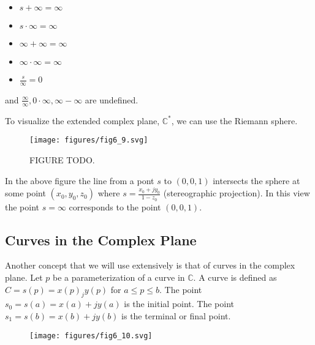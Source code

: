 \documentclass{article}
\begin{document}
\begin{itemize}
\item $s + \infty = \infty$
\item $s \cdot \infty = \infty$
\item $\infty + \infty = \infty$
\item $\infty \cdot \infty = \infty$
\item $\frac{s}{\infty} = 0$
\end{itemize}

and $\frac{\infty}{\infty}, 0\cdot\infty, \infty-\infty$ are undefined.

To visualize the extended complex plane, $\mathbb{C}^*$, we can use the Riemann sphere.

\begin{figure}
  \centering
  \texttt{[image: figures/fig6\_9.svg]}
  \caption{FIGURE TODO.}
\end{figure}

In the above figure the line from a pont $s$ to $(0,0,1)$ intersects the sphere at some point $(x_0,y_0,z_0)$ where $s = \frac{x_0 + jy_0}{1-z_0}$ (stereographic projection). In this view the point $s = \infty$ corresponds to the point $(0,0,1)$.

\subsection{Curves in the Complex Plane}

Another concept that we will use extensively is that of curves in the complex plane. Let $p$ be a parameterization of a curve in $\mathbb{C}$. A curve is defined as $C = s(p) = x(p) _ jy(p)$ for $a \leq p \leq b$. The point $s_0 = s(a) = x(a) + jy(a)$ is the initial point. The point $s_1 = s(b) = x(b) + jy(b)$ is the terminal or final point.

\begin{figure}
  \centering
  \texttt{[image: figures/fig6\_10.svg]}
\end{figure}
\end{document}
